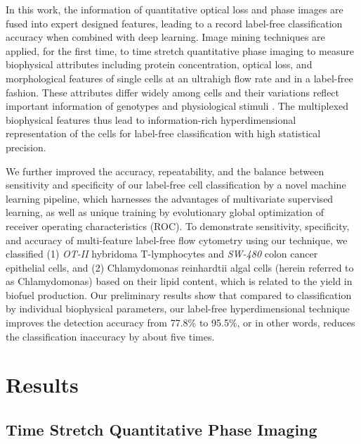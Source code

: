 \documentclass[aps,pra,reprint,superscriptaddress]{revtex4-1}
\begin{document}
In this work, the information of quantitative optical loss and phase images are fused into expert designed features, leading to a record label-free classification accuracy when combined with deep learning. Image mining techniques are applied, for the first time, to time stretch quantitative phase imaging to measure biophysical attributes including protein concentration, optical loss, and morphological features of single cells at an ultrahigh flow rate and in a label-free fashion. These attributes differ widely \cite{feinerman2008variability, sigal2006variability, friebel1999optical, vona2000isolation} among cells and their variations reflect important information of genotypes and physiological stimuli \cite{spencer2009non}. The multiplexed biophysical features thus lead to information-rich hyperdimensional representation of the cells for label-free classification with high statistical precision. 

We further improved the accuracy, repeatability, and the balance between sensitivity and specificity of our label-free cell classification by a novel machine learning pipeline, which harnesses the advantages of multivariate supervised learning, as well as unique training by evolutionary global optimization of receiver operating characteristics (ROC). To demonstrate sensitivity, specificity, and accuracy of multi-feature label-free flow cytometry using our technique, we classified (1) \textit{OT-II} hybridoma T-lymphocytes and \textit{SW-480} colon cancer epithelial cells, and (2) Chlamydomonas reinhardtii algal cells (herein referred to as Chlamydomonas) based on their lipid content, which is related to the yield in biofuel production. Our preliminary results show that compared to classification by individual biophysical parameters, our label-free hyperdimensional technique improves the detection accuracy from 77.8\% to 95.5\%, or in other words, reduces the classification inaccuracy by about five times. 

\section*{Results}
\subsection*{Time Stretch Quantitative Phase Imaging}
\end{document}
